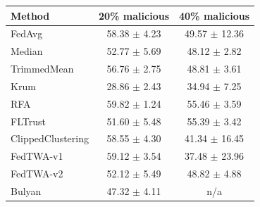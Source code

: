 \begin{tabular}{lcc}
\toprule
Method & 20\% malicious & 40\% malicious \\
\midrule
FedAvg & 58.38 $\pm$ 4.23 & 49.57 $\pm$ 12.36 \\
Median & 52.77 $\pm$ 5.69 & 48.12 $\pm$ 2.82 \\
TrimmedMean & 56.76 $\pm$ 2.75 & 48.81 $\pm$ 3.61 \\
Krum & 28.86 $\pm$ 2.43 & 34.94 $\pm$ 7.25 \\
RFA & 59.82 $\pm$ 1.24 & 55.46 $\pm$ 3.59 \\
FLTrust & 51.60 $\pm$ 5.48 & 55.39 $\pm$ 3.42 \\
ClippedClustering & 58.55 $\pm$ 4.30 & 41.34 $\pm$ 16.45 \\
FedTWA-v1 & 59.12 $\pm$ 3.54 & 37.48 $\pm$ 23.96 \\
FedTWA-v2 & 52.12 $\pm$ 5.49 & 48.82 $\pm$ 4.88 \\
Bulyan & 47.32 $\pm$ 4.11 & n/a \\
\bottomrule
\end{tabular}